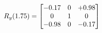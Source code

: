 \documentclass[preview]{standalone}
\begin{document}
\begin{align*}
\special{dvisvgm:raw <g id='unique000'>}R_{y}(1.75) = \begin{bmatrix}-0.17 & 0 & +0.98 \\0 & 1 & 0 \\-0.98 & 0 & -0.17\end{bmatrix}\special{dvisvgm:raw </g>}
\end{align*}
\end{document}
